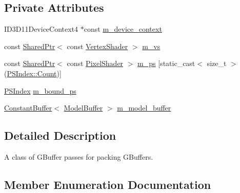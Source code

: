 \subsection*{Private Attributes}
\begin{DoxyCompactItemize}
\item 
I\+D3\+D11\+Device\+Context4 $\ast$const \hyperlink{classmage_1_1_g_buffer_pass_a56bcb08adf8a9b04a15efe24ef703c32}{m\+\_\+device\+\_\+context}
\item 
const \hyperlink{namespacemage_a1e01ae66713838a7a67d30e44c67703e}{Shared\+Ptr}$<$ const \hyperlink{classmage_1_1_vertex_shader}{Vertex\+Shader} $>$ \hyperlink{classmage_1_1_g_buffer_pass_a5baced2ca3d5018e35d25d6c1b5d8f20}{m\+\_\+vs}
\item 
const \hyperlink{namespacemage_a1e01ae66713838a7a67d30e44c67703e}{Shared\+Ptr}$<$ const \hyperlink{namespacemage_a27ecaf266420ee7a494d64edc0757129}{Pixel\+Shader} $>$ \hyperlink{classmage_1_1_g_buffer_pass_ae607b9a6dab89d45865dc0ede3212fcd}{m\+\_\+ps} \mbox{[}static\+\_\+cast$<$ size\+\_\+t $>$(\hyperlink{classmage_1_1_g_buffer_pass_a1dbae3cb33d9c90ce7eb8c119d576379ae93f994f01c537c4e2f7d8528c3eb5e9}{P\+S\+Index\+::\+Count})\mbox{]}
\item 
\hyperlink{classmage_1_1_g_buffer_pass_a1dbae3cb33d9c90ce7eb8c119d576379}{P\+S\+Index} \hyperlink{classmage_1_1_g_buffer_pass_aef8452f64c9815d002e552957ed9e342}{m\+\_\+bound\+\_\+ps}
\item 
\hyperlink{structmage_1_1_constant_buffer}{Constant\+Buffer}$<$ \hyperlink{structmage_1_1_model_buffer}{Model\+Buffer} $>$ \hyperlink{classmage_1_1_g_buffer_pass_a0538769957df6740993dbb479b7e05a2}{m\+\_\+model\+\_\+buffer}
\end{DoxyCompactItemize}


\subsection{Detailed Description}
A class of G\+Buffer passes for packing G\+Buffers. 

\subsection{Member Enumeration Documentation}
\hypertarget{classmage_1_1_g_buffer_pass_a1dbae3cb33d9c90ce7eb8c119d576379}{}\label{classmage_1_1_g_buffer_pass_a1dbae3cb33d9c90ce7eb8c119d576379} 
